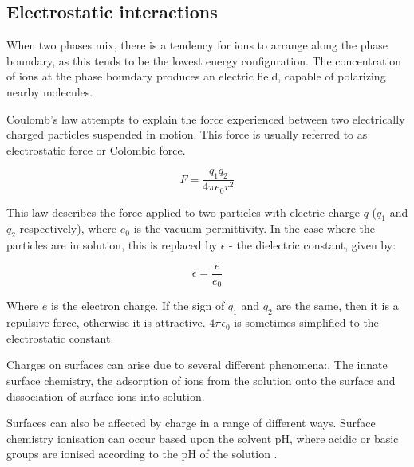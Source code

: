 \subsection{Electrostatic interactions} %

When two phases %
mix, there is a %
tendency for ions to arrange along the %
phase boundary, %
as this tends to be the lowest energy configuration. %
The concentration of ions at the phase boundary produces an electric field, capable of polarizing nearby molecules.

Coulomb's law attempts to explain the force experienced between two electrically charged particles suspended in motion. This force is usually referred to as electrostatic force or Colombic force.

\begin{equation} %
F = \frac{q_1q_2}{4 \pi e_0 r^2}
\end{equation}

This law describes the force applied to two particles with electric charge $q$ ($q_1$ and $q_2$ respectively), where $e_0$ is the vacuum permittivity. In the case where the particles are in solution, this is replaced by $\epsilon$ - the dielectric constant, given by: 

\begin{equation} %
\epsilon =  \frac{e}{e_0}
\end{equation}

Where $e$ is the electron charge. If the sign of $q_1$ and $q_2$ are the same, then it is a repulsive force, otherwise it is attractive. $4\pi \epsilon_0$ is sometimes simplified to the electrostatic constant. 

Charges on surfaces can arise due to several different phenomena:, The innate surface chemistry, the adsorption of ions from the solution onto the surface and dissociation of surface ions into solution.

Surfaces can also be affected by charge in a range of different ways.  Surface chemistry ionisation can occur based upon the solvent pH, where acidic or basic groups%
are ionised according to the pH of the solution . %

